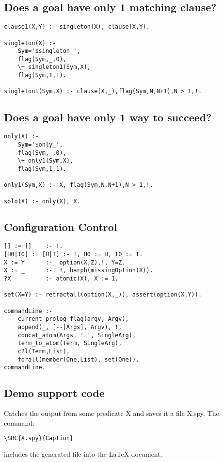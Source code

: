 \documentclass[twocolumn,10pt]{book}
\begin{document}
\subsection{ Does a goal have only 1 matching clause? }\begin{Verbatim}
clause1(X,Y) :- singleton(X), clause(X,Y).

singleton(X) :-
    Sym='$singleton_',
    flag(Sym,_,0),
    \+ singleton1(Sym,X),
    flag(Sym,1,1).

singleton1(Sym,X) :- clause(X,_),flag(Sym,N,N+1),N > 1,!.
\end{Verbatim}
\subsection{ Does a goal have only 1 way to succeed? }\begin{Verbatim}
only(X) :-
    Sym='$only_',
    flag(Sym,_,0),
    \+ only1(Sym,X),
    flag(Sym,1,1).

only1(Sym,X) :- X, flag(Sym,N,N+1),N > 1,!.

solo(X) :- only(X), X.
\end{Verbatim}
\subsection{ Configuration Control }\begin{Verbatim}
[] := []    :- !.
[H0|T0] := [H|T] :- !, H0 := H, T0 := T.
X := Y      :-  option(X,Z),!, Y=Z.
X := _      :-  !, barph(missingOption(X)).
?X          :- atomic(X), X := 1.

set(X=Y) :- retractall(option(X,_)), assert(option(X,Y)).

commandLine :-
    current_prolog_flag(argv, Argv),
    append(_, [--|Args], Argv), !,
    concat_atom(Args, ' ', SingleArg),
    term_to_atom(Term, SingleArg),
    c2l(Term,List),
    forall(member(One,List), set(One)).
commandLine.
\end{Verbatim}
\subsection{ Demo support code
}

Catches the output from some predicate X
and saves it a file X.spy. The command:

{\scriptsize
\begin{verbatim}
\SRC{X.spy}{Caption}
\end{verbatim}}
\noindent
includes the generated file into the {\LaTeX} document.
\end{document}
